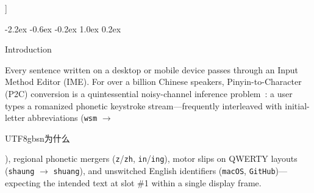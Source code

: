 \documentclass[10pt,twocolumn,letterpaper]{article}
\makeatletter
\newcommand{\zh}[1]{\begin{CJK*}{UTF8}{gbsn}{\small #1}\end{CJK*}}
\newcommand{\zh}[1]{#1}
\renewcommand\section{\@startsection {section}{1}{\z@}%
  {-2.2ex \@plus -0.6ex \@minus -0.2ex}%
  {1.0ex \@plus 0.2ex}%
  {\normalfont\large\bfseries\raggedright}}
\makeatother
\begin{document}
{\begin{center}
{{{      \par}
      \vspace{2pt}
    }%
  }
  \end{center}
  \vspace{0.8em}
}]

\section{Introduction}

Every sentence written on a desktop or mobile device passes through an Input Method Editor (IME). For over a billion Chinese speakers, Pinyin-to-Character (P2C) conversion is a quintessential noisy-channel inference problem~\cite{chen2000new,jia2014joint}: a user types a romanized phonetic keystroke stream---frequently interleaved with initial-letter abbreviations (\texttt{wsm} $\to$ \zh{为什么}), regional phonetic mergers (\texttt{z}/\texttt{zh}, \texttt{in}/\texttt{ing}), motor slips on QWERTY layouts (\texttt{shaung} $\to$ \texttt{shuang}), and unswitched English identifiers (\texttt{macOS}, \texttt{GitHub})---expecting the intended text at slot \#1 within a single display frame.
\end{document}
